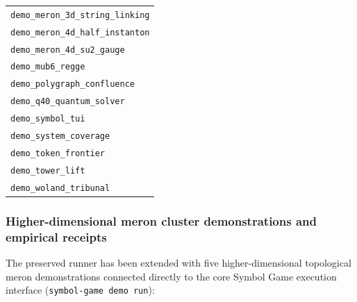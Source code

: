 \documentclass[
  11pt,
]{article}
\begin{document}
\begin{longtable}[]{@{}l@{}}
\texttt{demo\_\allowbreak{}meron\_\allowbreak{}3d\_\allowbreak{}string\_\allowbreak{}linking} \\
\texttt{demo\_\allowbreak{}meron\_\allowbreak{}4d\_\allowbreak{}half\_\allowbreak{}instanton} \\
\texttt{demo\_\allowbreak{}meron\_\allowbreak{}4d\_\allowbreak{}su2\_\allowbreak{}gauge} \\
\texttt{demo\_\allowbreak{}mub6\_\allowbreak{}regge} \\
\texttt{demo\_\allowbreak{}polygraph\_\allowbreak{}confluence} \\
\texttt{demo\_\allowbreak{}q40\_\allowbreak{}quantum\_\allowbreak{}solver} \\
\texttt{demo\_\allowbreak{}symbol\_\allowbreak{}tui} \\
\texttt{demo\_\allowbreak{}system\_\allowbreak{}coverage} \\
\texttt{demo\_\allowbreak{}token\_\allowbreak{}frontier} \\
\texttt{demo\_\allowbreak{}tower\_\allowbreak{}lift} \\
\texttt{demo\_\allowbreak{}woland\_\allowbreak{}tribunal} \\
\end{longtable}

\subsubsection{Higher-dimensional meron cluster demonstrations and
empirical
receipts}\label{higher-dimensional-meron-cluster-demonstrations-and-empirical-receipts}

The preserved runner has been extended with five higher-dimensional
topological meron demonstrations connected directly to the core Symbol
Game execution interface (\texttt{symbol-\allowbreak{}game demo run}):
\end{document}
